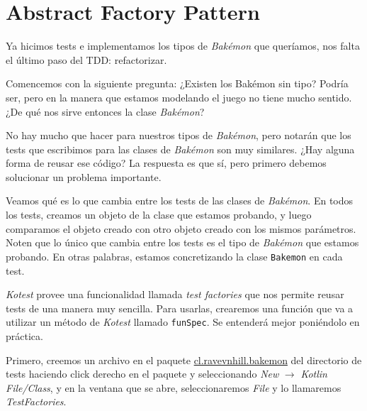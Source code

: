 \section{Abstract Factory Pattern}
\label{sec:abstract_factory_pattern}
  Ya hicimos tests e implementamos los tipos de \textit{Bakémon} que queríamos, nos falta el último
  paso del TDD: refactorizar.

  Comencemos con la siguiente pregunta: ¿Existen los Bakémon sin tipo?
  Podría ser, pero en la manera que estamos modelando el juego no tiene mucho sentido.
  ¿De qué nos sirve entonces la clase \textit{Bakémon}?
  

  No hay mucho que hacer para nuestros tipos de \textit{Bakémon}, pero notarán que los tests que
  escribimos para las clases de \textit{Bakémon} son muy similares.
  ¿Hay alguna forma de reusar ese código?
  La respuesta es que sí, pero primero debemos solucionar un problema importante.

  Veamos qué es lo que cambia entre los tests de las clases de \textit{Bakémon}.
  En todos los tests, creamos un objeto de la clase que estamos probando, y luego comparamos
  el objeto creado con otro objeto creado con los mismos parámetros.
  Noten que lo único que cambia entre los tests es el tipo de \textit{Bakémon} que estamos
  probando.
  En otras palabras, estamos concretizando la clase \texttt{Bakemon} en cada test.
  
  \textit{Kotest} provee una funcionalidad llamada \textit{test factories} que nos permite
  reusar tests de una manera muy sencilla.
  Para usarlas, crearemos una función que va a utilizar un método de \textit{Kotest} llamado
  \texttt{funSpec}.
  Se entenderá mejor poniéndolo en práctica.

  Primero, creemos un archivo en el paquete \url{cl.ravevnhill.bakemon} del directorio de tests 
  haciendo click derecho en el paquete y seleccionando \textit{New} \(\rightarrow\) 
  \textit{Kotlin File/Class}, y en la ventana que se abre, seleccionaremos \textit{File} y
  lo llamaremos \textit{TestFactories}.

  \begin{kotlin}
    
  \end{kotlin}